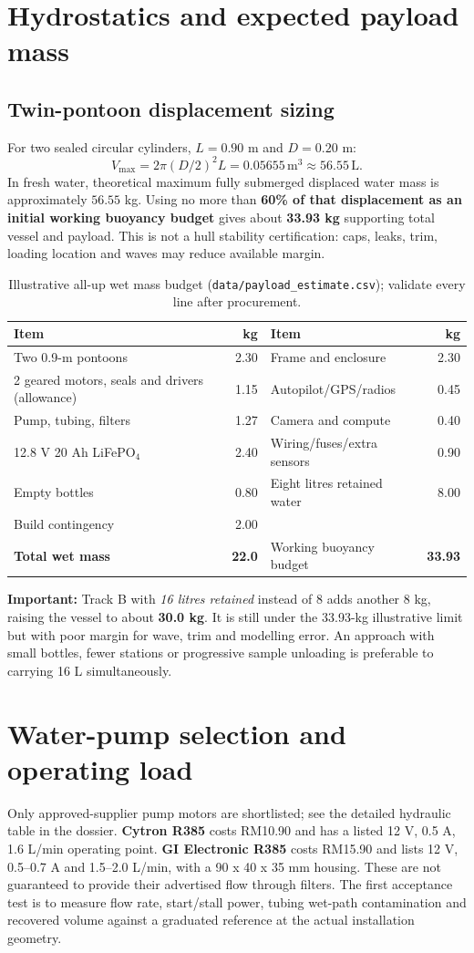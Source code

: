 \documentclass[10pt,a4paper]{article}
\begin{document}
\section{Hydrostatics and expected payload mass}
\subsection{Twin-pontoon displacement sizing}
For two sealed circular cylinders, $L=0.90$ m and $D=0.20$ m:
\[V_{\max}=2\pi(D/2)^2L=0.05655\,\mathrm{m}^3\approx56.55\,\mathrm{L}.\]
In fresh water, theoretical maximum fully submerged displaced water mass is approximately $56.55$ kg. Using no more than \textbf{60\% of that displacement as an initial working buoyancy budget} gives about \textbf{33.93 kg} supporting total vessel and payload. This is not a hull stability certification: caps, leaks, trim, loading location and waves may reduce available margin.
\begin{table}[H]\centering\footnotesize
\caption{Illustrative all-up wet mass budget (\texttt{data/payload\_estimate.csv}); validate every line after procurement.}
\begin{tabularx}{\linewidth}{@{}Y r Y r@{}}\toprule
Item & kg & Item & kg\\\midrule
Two 0.9-m pontoons & 2.30 & Frame and enclosure & 2.30\\
2 geared motors, seals and drivers (allowance) & 1.15 & Autopilot/GPS/radios & 0.45\\
Pump, tubing, filters & 1.27 & Camera and compute & 0.40\\
12.8 V 20 Ah LiFePO$_4$ & 2.40 & Wiring/fuses/extra sensors & 0.90\\
Empty bottles & 0.80 & Eight litres retained water & 8.00\\
Build contingency & 2.00 & & \\\midrule
\textbf{Total wet mass} & \textbf{22.0} & Working buoyancy budget & \textbf{33.93}\\\bottomrule\end{tabularx}\end{table}
\textbf{Important:} Track B with \emph{16 litres retained} instead of 8 adds another 8 kg, raising the vessel to about \textbf{30.0 kg}. It is still under the 33.93-kg illustrative limit but with poor margin for wave, trim and modelling error. An approach with small bottles, fewer stations or progressive sample unloading is preferable to carrying 16 L simultaneously.

\section{Water-pump selection and operating load}
Only approved-supplier pump motors are shortlisted; see the detailed hydraulic table in the dossier. \textbf{Cytron R385} costs RM10.90 and has a listed 12 V, 0.5 A, 1.6 L/min operating point. \textbf{GI Electronic R385} costs RM15.90 and lists 12 V, 0.5--0.7 A and 1.5--2.0 L/min, with a 90 x 40 x 35 mm housing. These are not guaranteed to provide their advertised flow through filters. The first acceptance test is to measure flow rate, start/stall power, tubing wet-path contamination and recovered volume against a graduated reference at the actual installation geometry.
\end{document}
